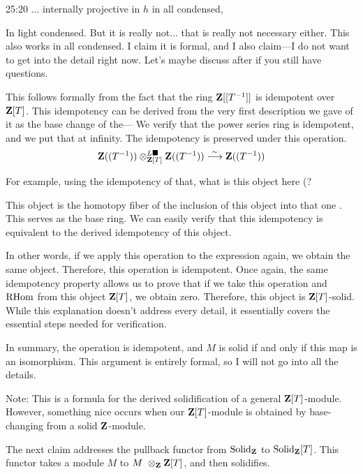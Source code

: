\begin{unfinished}{25:20}
\ques ... internally projective in $h$ in all condensed, 

\ans In light condensed. But it is really not... that is really not necessary either. This also works in all condensed. I claim it is formal, and I also claim---I do not want to get into the detail right now. Let's maybe discuss after if you still have questions.


\begin{sketch}
This follows formally from the fact that the ring $\mathbf Z[[T^{-1}]]$  is idempotent over $\mathbf Z[T]$. This idempotency can be derived from the very first description we gave of it as the base change of the--- We verify that the power series ring is idempotent, and we put that at infinity. The idempotency is preserved under this operation.
\begin{align*}
\mathbf Z((T^{-1})) \otimes_{\mathbf Z[T]}^{L\blacksquare} \mathbf Z((T^{-1})) \overset\sim\longrightarrow \mathbf Z((T^{-1}))
\end{align*}

For example, using the idempotency of that, what is this object here (? 

This object is the homotopy fiber of the inclusion of this object into that one . This serves as the base ring. We can easily verify that this idempotency is equivalent to the derived idempotency of this object.

In other words, if we apply this operation to the expression again, we obtain the same object. Therefore, this operation is idempotent.
Once again, the same idempotency property allows us to prove that if we take this operation and $\operatorname{RHom}$ from this object $\mathbf Z[T]$, we obtain zero. Therefore, this object is $\mathbf Z[T]$-solid. While this explanation doesn't address every detail, it essentially covers the essential steps needed for verification.

In summary, the operation is idempotent, and $M$ is solid if and only if this map  is an isomorphism. This argument is entirely formal, so I will not go into all the details.

\end{sketch}

Note: This is a formula for the derived solidification of a general $\mathbf Z[T]$-module. 
However, something nice occurs when our $\mathbf Z[T]$-module is obtained by base-changing from a solid $\mathbf Z$-module.

The next claim addresses the pullback functor from $\mathrm{Solid}_\mathbf Z$ to $\mathrm{Solid}_\mathbf Z[T]$. This functor takes a module $M$ to $M\ \otimes_\mathbf Z \mathbf Z[T]$, and then solidifies.


\end{unfinished}
